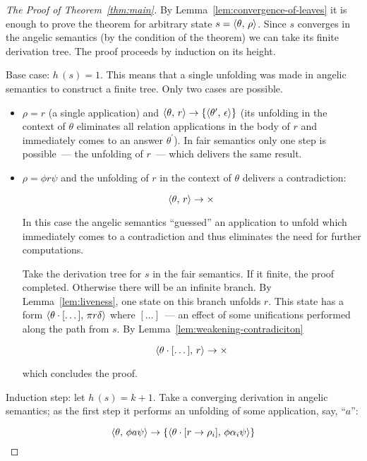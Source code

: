 \begin{proof}[The Proof of Theorem~\ref{thm:main}]
  By Lemma~\ref{lem:convergence-of-leaves} it is enough to prove the theorem for arbitrary state $s=\langle \theta,\,\rho \rangle$. Since $s$
  converges in the angelic semantics (by the condition of the theorem) we can take its finite derivation tree. The proof proceeds by induction
  on its height.

  Base case: $h\,(s)=1$. This means that a single unfolding was made in angelic semantics to construct a finite tree. Only two cases
  are possible.

  \begin{itemize}
  \item $\rho=r$ (a single application) and $\langle \theta,\,r \rangle\to\{\langle \theta^\prime,\,\epsilon \rangle\}$ (its unfolding in the context of $\theta$
    eliminates all relation applications in the body of $r$ and immediately comes to an answer $\theta^\prime$). In fair semantics only one step
    is possible~--- the unfolding of $r$~--- which delivers the same result.
    
  \item $\rho=\phi r \psi$ and the unfolding of $r$ in the context of $\theta$ delivers a contradiction:

    \[
    \langle \theta,\,r \rangle\to\times
    \]

    In this case the angelic semantics ``guessed'' an application to unfold which immediately comes to a contradiction and thus eliminates the
    need for further computations.

    Take the derivation tree for $s$ in the fair semantics. If it finite, the proof completed. Otherwise there will be an infinite branch. By
    Lemma~\ref{lem:liveness}, one state on this branch unfolds $r$. This state has a form $\langle \theta\cdot[\dots],\,\pi r \delta \rangle$ where
    $[\dots]$~--- an effect of some unifications performed along the path from $s$. By Lemma~\ref{lem:weakening-contradiciton}
    
    \[
    \langle \theta\cdot[\dots],\,r \rangle\to\times
    \]

    which concludes the proof.
    
  \end{itemize}

  Induction step: let $h\,(s)=k+1$. Take a converging derivation in angelic semantics; as the first step it performs an unfolding of
  some application, say, ``$a$'':

  \[
  \langle \theta,\,\phi a \psi \rangle \to \{\langle \theta\cdot[r\to\rho_i],\,\phi\alpha_i\psi \rangle\}
  \]


\end{proof}
